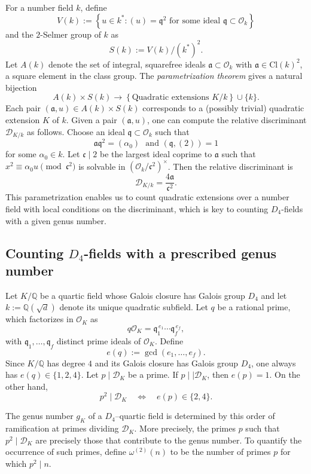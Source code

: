 \documentclass[11pt,reqno]{amsart}
\newcommand{\fq}{\mathfrak{q}}
\newcommand{\Q}{\mathbb{Q}}
\newcommand{\cD}{\mathcal{D}}
\newcommand{\cO}{\mathcal{O}}
\theoremstyle{definition}
\theoremstyle{remark}
\begin{document}
For a number field $k$, define
	$$
	V(k) := \left\{ u \in k^* : (u) = \mathfrak{q}^2 \text{ for some ideal } \mathfrak{q} \subset \mathcal{O}_k \right\}
	$$
	and the $2$-Selmer group of $k$ as
	\[
	S(k) := V(k) / (k^*)^2.
	\]
	Let $ A(k) $ denote the set of integral, squarefree ideals $ \mathfrak{a} \subset \mathcal{O}_k $ with $ \mathfrak{a} \in \text{Cl}(k)^2$, a square element in the class group. The \textit{parametrization theorem} \cite{CDO02} gives a natural bijection
	\[
	A(k) \times S(k) \longrightarrow \left\{ \text{Quadratic extensions } K/k \right\} \cup \{k\}.
	\]
	Each pair $ (\mathfrak{a}, u) \in A(k) \times S(k) $ corresponds to a (possibly trivial) quadratic extension $ K $ of $ k $. Given a pair $ (\mathfrak{a}, u) $, one can compute the relative discriminant $ \cD_{K/k} $ as follows. Choose an ideal $ \mathfrak{q} \subset \mathcal{O}_k $ such that
	\[
	\mathfrak{a} \mathfrak{q}^2 = (\alpha_0)\,\, \text{ and} \,\,(\mathfrak{q}, (2)) = 1
	\]
	for some $ \alpha_0 \in k $. Let $\mathfrak{c}\mid 2$ be the largest ideal coprime to $\mathfrak{a}$ such that $x^2 \equiv \alpha_0 u \pmod{\mathfrak{c}^2}$ is solvable in $ (\mathcal{O}_k / \mathfrak{c}^2)^\times $. Then the relative discriminant is 
	\[
	\cD_{K/k} = \frac{4 \mathfrak{a}}{\mathfrak{c}^2}.
	\]
	This parametrization enables us to count quadratic extensions over a number field with local conditions on the discriminant, which is key to counting $D_4$-fields with a given genus number.
\medskip
\subsection{Counting $D_4$-fields with a prescribed genus number }
Let $K/\Q$ be a quartic field whose Galois closure has Galois group $D_4$ and let $k:=\Q(\sqrt{d})$ denote its unique quadratic subfield. Let $q$ be a rational prime, which factorizes in $\cO_K$ as
$$
q\cO_K=\fq_1^{\,e_1}\cdots \fq_f^{\,e_f},
$$
with $\fq_1,\dots,\fq_f$ distinct prime ideals of $\cO_K$. Define
$$
e(q):=\gcd(e_1,\dots,e_f).
$$
Since $K/\Q$ has degree $4$ and its Galois closure has Galois group $D_4$, one always has $e(q)\in\{1,2,4\}$. Let $p\mid \cD_K$ be a prime. If
$p\mid\mid \cD_K$, then $e(p)=1$. On the other hand,
\[
p^2\mid \cD_K
\quad\Longleftrightarrow\quad
e(p)\in\{2,4\}.
\]

\noindent
The genus number $g_K$ of a $D_4$–quartic field is determined by this order of ramification at primes dividing $\cD_K$. More precisely, the primes $p$ such that $p^2 \mid \mathcal{D}_K$ are precisely those that contribute to the genus number. To quantify the occurrence of such primes, define 
$\omega^{(2)}(n)$ to be the number of primes $p$ for which $p^2 \mid n$. 
\end{document}
